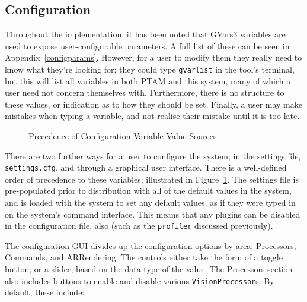 \documentclass[a4paper,10pt]{article}
\begin{document}
\subsection{Configuration}
Throughout the implementation, it has been noted that GVars3 variables are used to expose user-configurable parameters. A full list of these can be seen in Appendix~\ref{configparams}. However, for a user to modify them they really need to know what they're looking for; they could type \texttt{gvarlist} in the tool's terminal, but this will list all variables in both PTAM and this system, many of which a user need not concern themselves with. Furthermore, there is no structure to these values, or indication as to how they should be set. Finally, a user may make mistakes when typing a variable, and not realise their mistake until it is too late.

\begin{figure}[h]
  \begin{center}
  \end{center}
  \caption{Precedence of Configuration Variable Value Sources}
  \label{configprecedence}
\end{figure}

There are two further ways for a user to configure the system; in the settings file, \texttt{settings.cfg}, and through a graphical user interface. There is a well-defined order of precedence to these variables; illustrated in Figure~\ref{configprecedence}. The settings file is pre-populated prior to distribution with all of the default values in the system, and is loaded with the system to set any default values, as if they were typed in on the system's command interface. This means that any plugins can be disabled in the configuration file, also (such as the \texttt{profiler} discussed previously).

The configuration GUI divides up the configuration options by area; Processors, Commands, and ARRendering. The controls either take the form of a toggle button, or a slider, based on the data type of the value. The Processors section also includes buttons to enable and disable various \texttt{VisionProcessor}s. By default, these include:
\end{document}
